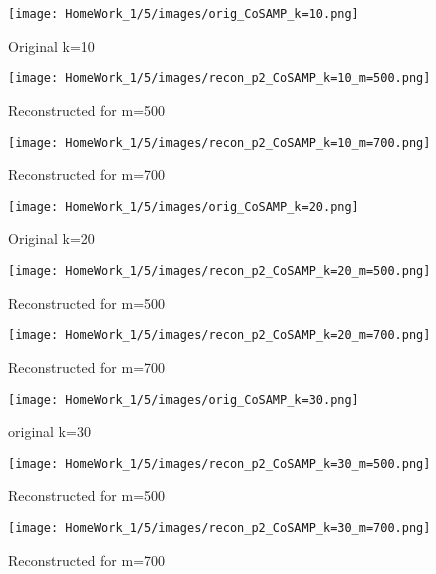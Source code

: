 \documentclass{article}
\begin{document}
\begin{figure}[h!]
    \centering
    \begin{minipage}{0.1\textwidth}
        \texttt{[image: HomeWork\_1/5/images/orig\_CoSAMP\_k=10.png]}
        \caption{Original k=10}
    \end{minipage}
    \hspace{0.5cm}
    \begin{minipage}{0.1\textwidth}
        \centering
        \texttt{[image: HomeWork\_1/5/images/recon\_p2\_CoSAMP\_k=10\_m=500.png]}
        \caption{Reconstructed for m=500}
    \end{minipage}
    \hspace{0.5cm}
    \begin{minipage}{0.1\textwidth}
        \centering
        \texttt{[image: HomeWork\_1/5/images/recon\_p2\_CoSAMP\_k=10\_m=700.png]}
        \caption{Reconstructed for m=700}
    \end{minipage}
\end{figure}

\begin{figure}[h!]
    \centering
    \begin{minipage}{0.1\textwidth}
        \texttt{[image: HomeWork\_1/5/images/orig\_CoSAMP\_k=20.png]}
        \caption{Original k=20}
    \end{minipage}
    \hspace{0.5cm}
    \begin{minipage}{0.1\textwidth}
        \centering
        \texttt{[image: HomeWork\_1/5/images/recon\_p2\_CoSAMP\_k=20\_m=500.png]}
        \caption{Reconstructed for m=500}
    \end{minipage}
    \hspace{0.5cm}
    \begin{minipage}{0.1\textwidth}
        \centering
        \texttt{[image: HomeWork\_1/5/images/recon\_p2\_CoSAMP\_k=20\_m=700.png]}
        \caption{Reconstructed for m=700}
    \end{minipage}
\end{figure}

\begin{figure}[h!]
    \centering
    \begin{minipage}{0.1\textwidth}
        \texttt{[image: HomeWork\_1/5/images/orig\_CoSAMP\_k=30.png]}
        \caption{original k=30}
    \end{minipage}
    \hspace{0.5cm}
    \begin{minipage}{0.1\textwidth}
        \centering
        \texttt{[image: HomeWork\_1/5/images/recon\_p2\_CoSAMP\_k=30\_m=500.png]}
        \caption{Reconstructed for m=500}
    \end{minipage}
    \hspace{0.5cm}
    \begin{minipage}{0.1\textwidth}
        \centering
        \texttt{[image: HomeWork\_1/5/images/recon\_p2\_CoSAMP\_k=30\_m=700.png]}
        \caption{Reconstructed for m=700}
    \end{minipage}
\end{figure}
\end{document}
